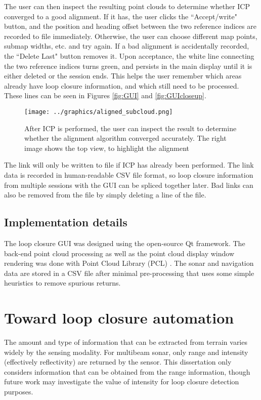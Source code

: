 The user can then inspect the resulting point clouds to determine whether ICP converged to a good alignment. If it has, the user clicks the ``Accept/write" button, and the position and heading offset between the two reference indices are recorded to file immediately. Otherwise, the user can choose different map points, submap widths, etc. and try again. If a bad alignment is accidentally recorded, the ``Delete Last" button removes it. Upon acceptance, the white line connecting the two reference indices turns green, and persists in the main display until it is either deleted or the session ends. This helps the user remember which areas already have loop closure information, and which still need to be processed. These lines can be seen in Figures \ref{fig:GUI} and \ref{fig:GUIcloseup}.

 \begin{figure}[htbp]
   \centering
   \texttt{[image: ../graphics/aligned\_subcloud.png]} %
   \caption{After ICP is performed, the user can inspect the result to determine whether the alignment algorithm converged accurately. The right image shows the top view, to highlight the alignment}
   \label{fig:GUI_poseicp}
\end{figure}

The link will only be written to file if ICP has already been performed. The link data is recorded in human-readable CSV file format, so loop closure information from multiple sessions with the GUI can be spliced together later. Bad links can also be removed from the file by simply deleting a line of the file. 

\subsection{Implementation details}

The loop closure GUI was designed using the open-source Qt framework. The back-end point cloud processing as well as the point cloud display window rendering was done with Point Cloud Library (PCL) \cite{PCL}. The sonar and navigation data are stored in a CSV file after minimal pre-processing that uses some simple heuristics to remove spurious returns.

\section{Toward loop closure automation}

The amount and type of information that can be extracted from terrain varies widely by the sensing modality. For multibeam sonar, only range and intensity (effectively reflectivity) are returned by the sensor. This dissertation only considers information that can be obtained from the range information, though future work may investigate the value of intensity for loop closure detection purposes.

